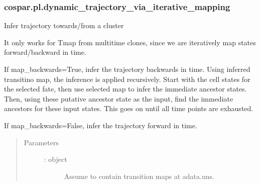 \documentclass[letterpaper,10pt,english]{sphinxmanual}
\begin{document}
\subsubsection{cospar.pl.dynamic\_trajectory\_via\_iterative\_mapping}
\label{\detokenize{cospar.pl.dynamic_trajectory_via_iterative_mapping:cospar-pl-dynamic-trajectory-via-iterative-mapping}}\label{\detokenize{cospar.pl.dynamic_trajectory_via_iterative_mapping::doc}}

\begin{fulllineitems}
\label{\detokenize{cospar.pl.dynamic_trajectory_via_iterative_mapping:cospar.pl.dynamic_trajectory_via_iterative_mapping}}
Infer trajectory towards/from a cluster

It only works for Tmap from multi\sphinxhyphen{}time clones, since we are
iteratively map states forward/backward in time.

If map\_backwards=True, infer the trajectory backwards in time.
Using inferred transitino map, the inference is applied recursively.
Start with the cell states for the selected fate, then use selected
map to infer the immediate ancestor states. Then, using these putative
ancestor state as the input, find the immediate ancestors for these
input states. This goes on until all time points are exhausted.

If map\_backwards=False, infer the trajectory forward in time.
\begin{quote}\begin{description}
\item[{Parameters}] \leavevmode\begin{description}
\item[{ :  object}] \leavevmode
Assume to contain transition maps at adata.uns.


\end{description}
\end{description}
\end{quote}
\end{fulllineitems}
\end{document}
